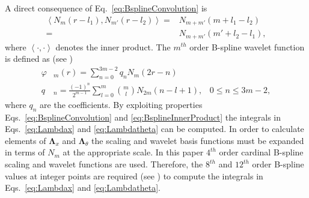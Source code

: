 \documentclass[journal,a4paper]{IEEEtran}
\begin{document}
A direct consequence of Eq.~\eqref{eq:BsplineConvolution} is 
\begin{align}
 \left\langle N_{m}\left(r-l_{1}\right), N_{m'}\left(r-l_{2}\right)\right\rangle=&N_{m+m'}\left(m+l_{1}-l_{2}\right)\nonumber \\
=&N_{m+m'}\left(m'+l_{2}-l_{1}\right),
\label{eq:BsplineInnerProduct}
\end{align}
where $\left\langle \cdot,\cdot\right\rangle $ denotes the inner product. The $m^{th}$ order B-spline wavelet function is defined as (see \cite{Chui1992}) 
\begin{align}
 \varphi & _{m}\left(r\right) = \sum_{n=0}^{3m-2} q_n N_{m}\left(2r-n\right) \\
 q & _n = \frac{\left(-1\right)^n}{2^{m-1}} \sum_{l=0}^{m} \binom{m}{l} N_{2m}\left(n-l+1\right), \,  \text{ $0\le n\le 3m-2$},
\end{align}
where $q_n$ are the coefficients. By exploiting properties Eqs.~\ref{eq:BsplineConvolution} and \ref{eq:BsplineInnerProduct} the integrals in Eqs.~\ref{eq:Lambdax} and \ref{eq:Lambdatheta} can be computed. In order to calculate elements of $\boldsymbol\Lambda_{x}$ and $\boldsymbol\Lambda_{\theta}$ the scaling and wavelet basis functions must be expanded in terms of $N_m$ at the appropriate scale.  In this paper $4^{th}$ order cardinal B-spline scaling and wavelet functions are used. Therefore, the $8^{th}$ and $12^{th}$ order B-spline values at integer points are required (see \cite{Goswami1999}) to compute the integrals in Eqs.~\ref{eq:Lambdax} and \ref{eq:Lambdatheta}.
\end{document}
